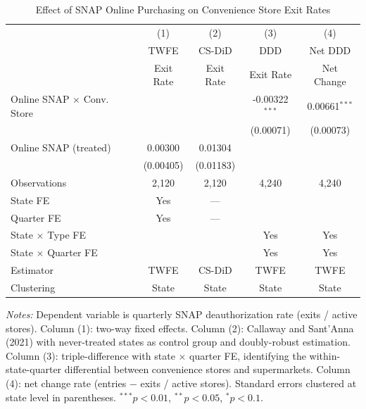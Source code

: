 \begin{table}[t]
\centering
\caption{Effect of SNAP Online Purchasing on Convenience Store Exit Rates}
\label{tab:main}
\begin{tabular}{lcccc}
\toprule
 & (1) & (2) & (3) & (4) \\
 & TWFE & CS-DiD & DDD & Net DDD \\
 & Exit Rate & Exit Rate & Exit Rate & Net Change \\
\midrule
Online SNAP $\times$ Conv. Store & & & -0.00322$^{***}$ & 0.00661$^{***}$ \\
 & & & (0.00071) & (0.00073) \\
Online SNAP (treated) & 0.00300 & 0.01304 & & \\
 & (0.00405) & (0.01183) & & \\
\midrule
Observations & 2,120 & 2,120 & 4,240 & 4,240 \\
State FE & Yes & --- & & \\
Quarter FE & Yes & --- & & \\
State $\times$ Type FE & & & Yes & Yes \\
State $\times$ Quarter FE & & & Yes & Yes \\
Estimator & TWFE & CS-DiD & TWFE & TWFE \\
Clustering & State & State & State & State \\
\bottomrule
\end{tabular}
\begin{tablenotes}
\item \textit{Notes:} Dependent variable is quarterly SNAP deauthorization rate (exits / active stores). Column (1): two-way fixed effects. Column (2): Callaway and Sant'Anna (2021) with never-treated states as control group and doubly-robust estimation. Column (3): triple-difference with state $\times$ quarter FE, identifying the within-state-quarter differential between convenience stores and supermarkets. Column (4): net change rate (entries $-$ exits / active stores). Standard errors clustered at state level in parentheses. $^{***}p<0.01$, $^{**}p<0.05$, $^{*}p<0.1$.
\end{tablenotes}
\end{table}

